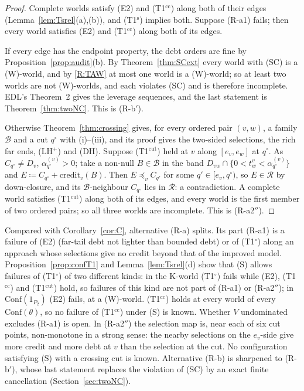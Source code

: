 \documentclass[11pt]{article}
\theoremstyle{definition}\newtheorem{definition}[theorem]{Definition}
\theoremstyle{remark}\newtheorem{remark}[theorem]{Remark}
\newcommand{\cred}{\mathrm{credit}}
\newcommand{\Bfam}{\mathcal B}
\newcommand{\To}{\textup{(T1$^\circ$)}}
\newcommand{\Ts}{\textup{(T1$^{\mathrm s}$)}}
\newcommand{\Tcc}{\textup{(T1$^{\mathrm{cc}}$)}}
\newcommand{\Tcut}{\textup{(T1$^{\mathrm{cut}}$)}}
\begin{document}
\begin{proof}
Complete worlds satisfy (E2) and \Tcc{} along both of their edges
(Lemma~\ref{lem:Tsrel}(a),(b)), and \Ts{} implies both. Suppose (R-a1)
fails; then every world satisfies (E2) and \Tcc{} along both of its edges.

If every edge has the endpoint property, the debt orders are fine by
Proposition~\ref{prop:audit}(b). By Theorem~\ref{thm:SCext} every world
with (SC) is a (W)-world, and by \ref{R:TAW} at most one world is a
(W)-world; so at least two worlds are not (W)-worlds, and each violates (SC)
and is therefore incomplete. EDL's Theorem~2 gives the leverage sequences,
and the last statement is Theorem~\ref{thm:twoNC}. This is (R-b$'$).

Otherwise Theorem~\ref{thm:crossing} gives, for every ordered pair
$(v,w)$, a family $\Bfam$ and a cut $q^\circ$ with (i)--(iii), and its
proof gives the two-sided selections, the rich far ends, (LH$^+$) and (DH).
Suppose \Tcut{} held at $v$ along $[e_v,e_w]$ at $q^\circ$. As
$C_{q^\circ}\ne D_v$, $\alpha^{(v)}_{q^\circ}>0$; take a non-null
$B\in\Bfam$ in the band $D_{vw}\cap\{0<t^v_w<\alpha^{(v)}_{q^\circ}\}$ and
$E\coloneqq C_{q^\circ}+\cred_v(B)$. Then $E\preceq_vC_{q'}$ for some
$q'\in[e_v,q^\circ)$, so $E\in\mathcal R$ by down-closure, and its
$\Bfam$-neighbour $C_{q^\circ}$ lies in $\mathcal R$: a contradiction. A
complete world satisfies \Tcut{} along both of its edges, and every world is
the first member of two ordered pairs; so all three worlds are incomplete.
This is (R-a2$''$).
\end{proof}

Compared with Corollary~\ref{cor:C}, alternative (R-a) splits. Its part
(R-a1) is a failure of (E2) (far-tail debt not lighter than bounded debt) or
of \To{} along an approach whose selections give no credit beyond that of
the improved model. Proposition~\ref{prop:confT1} and
Lemma~\ref{lem:Tsrel}(d) show that (S) allows failures of \To{} of two
different kinds: in the K-world \To{} fails while (E2), \Tcc{} and \Tcut{}
hold, so failures of this kind are not part of (R-a1) or (R-a2$''$); in
$\mathrm{Conf}(1_{P_2})$ (E2) fails, at a (W)-world. \Tcc{} holds at every
world of every $\mathrm{Conf}(\theta)$, so no failure of \Tcc{} under (S) is
known. Whether $V$ undominated excludes (R-a1) is open. In
(R-a2$''$) the selection map is, near each of six cut points, non-monotone in
a strong sense: the nearby selections on the $e_v$-side give more credit and
more debt at $v$ than the selection at the cut. No configuration satisfying
(S) with a crossing cut is known. Alternative (R-b) is sharpened to
(R-b$'$), whose last statement replaces the violation of (SC) by an exact
finite cancellation (Section~\ref{sec:twoNC}).
\end{document}
